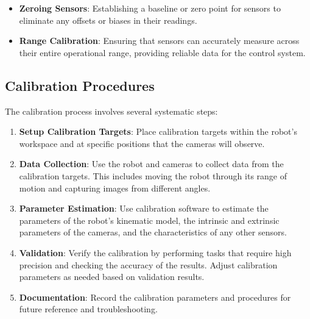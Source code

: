 \begin{itemize}
    \item \textbf{Zeroing Sensors}: Establishing a baseline or zero point for sensors to eliminate any offsets or biases in their readings.
    \item \textbf{Range Calibration}: Ensuring that sensors can accurately measure across their entire operational range, providing reliable data for the control system.
\end{itemize}

\subsection{Calibration Procedures}
The calibration process involves several systematic steps:

\begin{enumerate}
    \item \textbf{Setup Calibration Targets}: Place calibration targets within the robot’s workspace and at specific positions that the cameras will observe.
    \item \textbf{Data Collection}: Use the robot and cameras to collect data from the calibration targets. This includes moving the robot through its range of motion and capturing images from different angles.
    \item \textbf{Parameter Estimation}: Use calibration software to estimate the parameters of the robot’s kinematic model, the intrinsic and extrinsic parameters of the cameras, and the characteristics of any other sensors.
    \item \textbf{Validation}: Verify the calibration by performing tasks that require high precision and checking the accuracy of the results. Adjust calibration parameters as needed based on validation results.
    \item \textbf{Documentation}: Record the calibration parameters and procedures for future reference and troubleshooting.
\end{enumerate}

